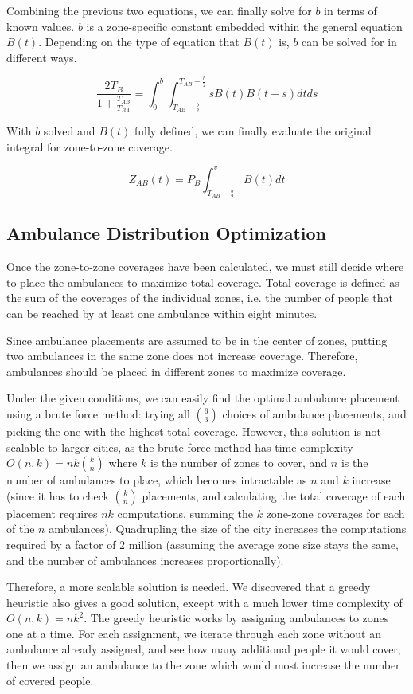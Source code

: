 \documentclass[notitlepage, 12pt]{article}
\begin{document}
Combining the previous two equations, we can finally solve for $b$ in terms of known values. $b$ is a zone-specific constant embedded within the general equation $B(t)$. Depending on the type of equation that $B(t)$ is, $b$ can be solved for in different ways. 

$$\frac {2T_B}{1+ \frac{T_{AB}}{T_{BA}}} = \int^b_0 \int^{T_{AB} + \frac{b}{2}}_{T_{AB} - \frac{b}{2}} s B(t) B(t-s) dt ds$$

With $b$ solved and $B(t)$ fully defined, we can finally evaluate the original integral for zone-to-zone coverage.

$$Z_{AB}(t) = P_B \int^v_{T_{AB} - \frac{b}{2}} B(t) dt$$

\subsection{Ambulance Distribution Optimization}
Once the zone-to-zone coverages have been calculated, we must still decide where to place
the ambulances to maximize total coverage. Total coverage is defined as the sum of the coverages
of the individual zones, i.e. the number of people that can be reached by at least one ambulance
within eight minutes.

Since ambulance placements are assumed to be in the center of zones, putting two ambulances in the same
zone does not increase coverage. Therefore, ambulances should be placed in different zones to maximize
coverage.

Under the given conditions, we can easily find the optimal ambulance placement using a brute force
method: trying all $\binom{6}{3}$ choices of ambulance placements, and picking the one with the highest total coverage.
However, this solution is not scalable to larger cities, as the brute force method has time complexity
$O(n, k) = nk\binom{k}{n}$ where $k$ is the number of zones to cover, and $n$ is the number of ambulances to place, which
becomes intractable as $n$ and $k$ increase (since it has to check $\binom{k}{n}$ placements,
and calculating the total coverage of each placement requires $nk$ computations, summing the $k$ zone-zone
coverages for each of the $n$ ambulances). Quadrupling the size of the city
increases the computations required by a factor of 2 million (assuming the average zone size stays the same,
and the number of ambulances increases proportionally).

Therefore, a more scalable solution is needed. We discovered that a greedy heuristic also gives a good solution,
except with a much lower time complexity of $O(n, k) = n k^2$. The greedy heuristic works by assigning ambulances to zones
one at a time. For each assignment, we iterate through each zone without an ambulance already assigned, and see how many
additional people it would cover; then we assign an ambulance to the zone which would most increase the number of
covered people.
\end{document}
